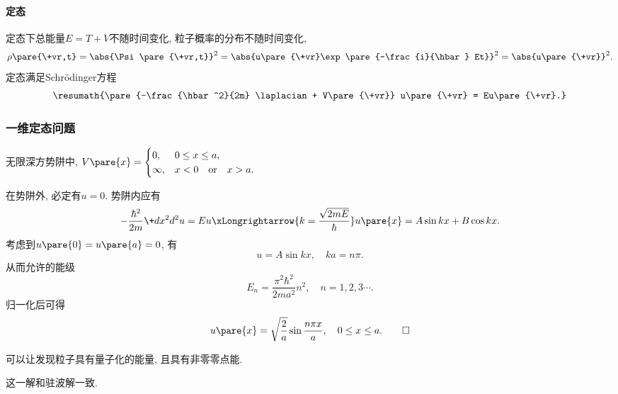 \documentclass[hidelinks]{ctexart}
\begin{document}
\paragraph{定态} %
\label{par:定态}

定态下总能量$E=T+V$不随时间变化, 粒子概率的分布不随时间变化,
\[ \rho\pare{\+vr,t} = \abs{\Psi\pare{\+vr,t}}^2 = \abs{u\pare{\+vr}\exp\pare{-\frac{i}{\hbar} Et}}^2 = \abs{u\pare{\+vr}}^2. \]
定态满足Schr\"odinger方程
\[ \resumath{\pare{-\frac{\hbar^2}{2m} \laplacian + V\pare{\+vr}} u\pare{\+vr} = Eu\pare{\+vr}.} \]



\subsubsection{一维定态问题} %
\label{ssub:一维定态问题}

\begin{sample}
    \begin{ex}
        无限深方势阱中, $\displaystyle V\pare{x} = \begin{cases}
            0, & 0\le x\le a,\\
            \infty, & x < 0\quad \mathrm{or} \quad x>a.
        \end{cases}$
    \end{ex}
    \begin{solution}
        在势阱外, 必定有$u = 0$. 势阱内应有
        \[ -\frac{\hbar^2}{2m}\+d{x^2}d{^2u} = Eu \xLongrightarrow{k = \frac{\sqrt{2mE}}{\hbar}} u\pare{x} = A\sin kx + B\cos kx. \]
        考虑到$u\pare{0} = u\pare{a} = 0$, 有
        \[ u = A\sin kx,\quad ka = n\pi. \]
        从而允许的能级
        \[ E_n = \frac{\pi^2 \hbar^2}{2ma^2}n^2,\quad n = 1,2,3\cdots. \]
        归一化后可得
        \[ u\pare{x} = \sqrt{\frac{2}{a}}\sin \frac{n\pi x}a,\quad 0\le x \le a. \qedhere \]
    \end{solution}
\end{sample}
\begin{remark}
    可以让发现粒子具有量子化的能量, 且具有非零零点能.
\end{remark}
\begin{remark}
    这一解和驻波解一致.
\end{remark}


\end{document}
